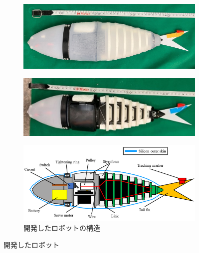 \begin{figure}[htbp]
    \centering  
    \begin{subfigure}[b]{0.8\linewidth}
        \centering
        \includegraphics[width=0.9\linewidth]{chapters/picture/withskin.jpg}
        \label{fig:fishrobo_with}
    \end{subfigure}
    \begin{subfigure}[b]{0.8\linewidth}
        \centering
        \includegraphics[width=0.9\linewidth]{chapters/picture/without_skin.jpg}
        \label{fig:fishrobo_less}
    \end{subfigure}
    \begin{subfigure}[b]{0.8\linewidth}
        \centering
        \includegraphics[width=0.9\linewidth]{chapters/picture/fish.png}
        \caption{開発したロボットの構造}
        \label{fig:kouzou}
    \end{subfigure}
    \caption{開発したロボット}
    \label{fig:gaikan}
\end{figure}


